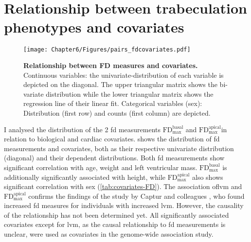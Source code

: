 \section{Relationship between trabeculation phenotypes and covariates}
\begin{figure}[hbtp]
	\centering
	\texttt{[image: Chapter6/Figures/pairs\_fdcovariates.pdf]}
	\caption[\textbf{Relationship between FD measures and covariates. }]{\textbf{Relationship between FD measures and covariates. }Continuous variables: the univariate-distribution of each variable is depicted on the diagonal. The upper triangular matrix shows the bi-variate distribution while the lower triangular matrix shows the regression line of their linear fit. Categorical variables (sex): Distribution (first row) and counts (first column) are depicted. } 
	 	\label{fig:covariates-FD}
\end{figure}

I analysed the distribution of the \num{2} \gls{fd} measurements  \(\text{FD}_\text{max}^\text{basal}\) and \(\text{FD}_\text{max}^\text{apical}\)in relation to biological and cardiac covariates.  shows the distribution of \gls{fd} measurements and covariates, both as their respective univariate distribution (diagonal) and their dependent distributions. Both \gls{fd} measurements show significant correlation with age, weight and left ventricular mass.   \(\text{FD}_\text{max}^\text{basal}\) is additionally significantly associated with height, while \(\text{FD}_\text{max}^\text{apical}\) also shows significant correlation with sex (\cref{tab:covariates-FD}). The association of\gls{lvm} and \(\text{FD}_\text{max}^\text{apical}\)  confirms the findings of the study by Captur and colleagues \citep{Captur2014}, who found increased \gls{fd} measures for individuals with increased \gls{lvm}. However, the causality of the relationship has not been determined yet. All significantly associated covariates except for \gls{lvm}, as the causal relationship to \gls{fd} measurements is unclear, were used as covariates in the genome-wide association study. 

